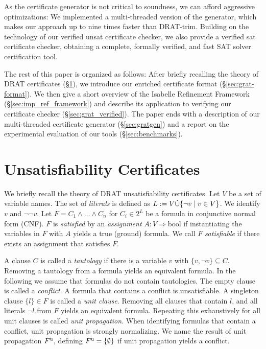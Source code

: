 \documentclass{llncs}
\begin{document}
As the certificate generator is not critical to soundness, we can afford aggressive optimizations:
We implemented a multi-threaded version of the generator, which makes our approach up to nine times faster than DRAT-trim.
Building on the technology of our verified unsat certificate checker, we also provide a verified sat certificate checker, 
obtaining a complete, formally verified, and fast SAT solver certification tool.

The rest of this paper is organized as follows: 
After briefly recalling the theory of DRAT certificates (\S\ref{sec:unsat_cert}), we introduce our enriched certificate format (\S\ref{sec:grat-format}).
We then give a short overview of the Isabelle Refinement Framework (\S\ref{sec:imp_ref_framework})
and describe its application to verifying our certificate checker (\S\ref{sec:grat_verified}). 
The paper ends with a description of our multi-threaded certificate generator (\S\ref{sec:gratgen}) and a report on the experimental evaluation 
of our tools (\S\ref{sec:benchmarks}).

\section{Unsatisfiability Certificates}\label{sec:unsat_cert}
We briefly recall the theory of DRAT unsatisfiability certificates. 
Let $V$ be a set of variable names. The set of \emph{literals} is defined as $L := V \dot{\cup} \{\neg v \mid v\in V \}$.
We identify $v$ and $\neg\neg v$.
Let $F = C_1 \wedge \ldots \wedge C_n$ for $C_i \in 2^L$ be a formula in conjunctive normal form (CNF). 
$F$ is \emph{satisfied} by an \emph{assignment} $A : V \Rightarrow \textrm{bool}$ if instantiating the variables in $F$ with $A$ yields a true (ground) formula.
We call $F$ \emph{satisfiable} if there exists an assignment that satisfies $F$.

A clause $C$ is called a \emph{tautology} if there is a variable $v$ with $\{v,\neg v\} \subseteq C$. Removing a tautology from a formula yields an equivalent formula.
In the following we assume that formulas do not contain tautologies.
The empty clause is called a \emph{conflict}. A formula that contains a conflict is unsatisfiable. 
A singleton clause $\{l\} \in F$ is called a \emph{unit clause}. Removing all clauses that contain $l$, and all literals $\neg l$ from $F$ yields an equivalent formula.
Repeating this exhaustively for all unit clauses is called \emph{unit propagation}. When identifying formulas that contain a conflict, unit propagation is strongly normalizing. 
We name the result of unit propagation $F^{\textrm u}$, defining $F^{\textrm u} = \{\emptyset\}$ if unit propagation yields a conflict.
\end{document}
